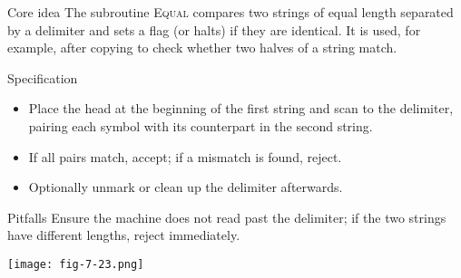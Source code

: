 \begin{frame}[t]{}
  \begin{tblock}{Core idea}
    The subroutine \textsc{Equal} compares two strings of equal
    length separated by a delimiter and sets a flag (or halts) if
    they are identical.  It is used, for example, after copying to
    check whether two halves of a string match.
  \end{tblock}
  \begin{tblock}{Specification}
    \begin{itemize}
      \item Place the head at the beginning of the first string and
        scan to the delimiter, pairing each symbol with its counterpart
        in the second string.
      \item If all pairs match, accept; if a mismatch is found,
        reject.
      \item Optionally unmark or clean up the delimiter afterwards.
    \end{itemize}
  \end{tblock}
  \begin{talert}{Pitfalls}
    Ensure the machine does not read past the delimiter; if the two
        strings have different lengths, reject immediately.
  \end{talert}
  \centering
  \texttt{[image: fig-7-23.png]} %
  \label{fr:7.4-08}
\end{frame}

